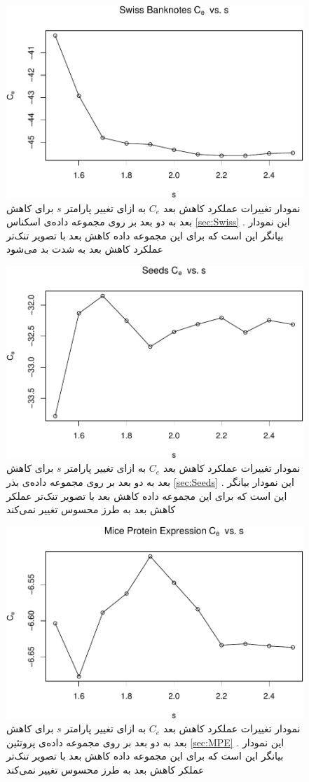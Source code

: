 \begin{figure}[H]
\centering
\includegraphics[width=0.7\linewidth]{Report_files/figure-latex/unnamed-chunk-24-4}
\caption{
نمودار تغییرات عملکرد کاهش بعد 
$C_e$
به ازای تغییر پارامتر
$s$
برای کاهش بعد به 
دو
بعد بر روی مجموعه داده‌‌‌ی 
اسکناس
\ref{sec:Swiss}
. این نمودار بیانگر این است که برای این مجموعه داده کاهش بعد 
با تصویر تنک‌تر عملکرد کاهش بعد به شدت بد می‌شود
}
\end{figure}

\begin{figure}[H]
\centering
\includegraphics[width=0.7\linewidth]{Report_files/figure-latex/unnamed-chunk-24-5}
\caption{
نمودار تغییرات عملکرد کاهش بعد 
$C_e$
به ازای تغییر پارامتر
$s$
برای کاهش بعد به 
دو
بعد بر روی مجموعه داده‌‌‌ی 
بذر
\ref{sec:Seeds}
. این نمودار بیانگر این است که برای این مجموعه داده کاهش بعد 
با تصویر تنک‌تر عملکر کاهش بعد به طرز محسوس تغییر نمی‌کند
}
\end{figure}

\begin{figure}[H]
\centering
\includegraphics[width=0.7\linewidth]{Report_files/figure-latex/unnamed-chunk-24-6}
\caption{
نمودار تغییرات عملکرد کاهش بعد 
$C_e$
به ازای تغییر پارامتر
$s$
برای کاهش بعد به 
دو
 بعد بر روی مجموعه داده‌‌‌ی 
پروتئین
\ref{sec:MPE}
. این نمودار بیانگر این است که برای این مجموعه داده کاهش بعد 
با تصویر تنک‌تر عملکر کاهش بعد به طرز محسوس تغییر نمی‌کند
}
\end{figure}

